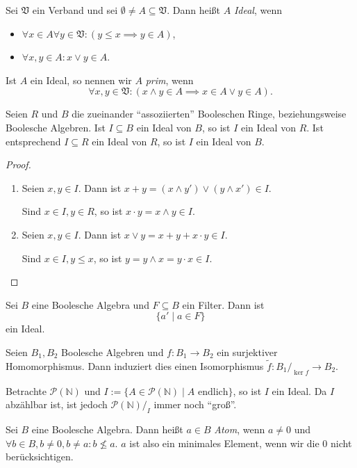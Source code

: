 \begin{definition}
    Sei $\mathfrak{V}$ ein Verband und sei $\emptyset \neq A \subseteq \mathfrak{V}$. Dann heißt $A$ \emph{Ideal}, wenn
    \begin{itemize}
        \item $\forall x \in A \forall y \in \mathfrak{V} : ( y \leq x \implies y \in A )$,
        \item $\forall x, y \in A : x \lor y \in A$.
    \end{itemize}
    Ist $A$ ein Ideal, so nennen wir $A$ \emph{prim}, wenn
    $$ \forall x, y \in \mathfrak{V} : ( x \land y \in A \implies x \in A \lor y \in A ). $$
\end{definition}

\begin{proposition}
    Seien $R$ und $B$ die zueinander ``assoziierten'' Booleschen Ringe, beziehungsweise Boolesche Algebren. Ist $I \subseteq B$ ein Ideal von $B$, so ist $I$ ein Ideal von $R$. Ist entsprechend $I \subseteq R$ ein Ideal von $R$, so ist $I$ ein Ideal von $B$.
\end{proposition}

\begin{proof}{\ }
    \begin{enumerate}
        \item Seien $x, y \in I$. Dann ist $x + y = (x \land y') \lor (y \land x') \in I$.

        Sind $x \in I, y \in R$, so ist $x \cdot y = x \land y \in I$.

        \item Seien $x, y \in I$. Dann ist $x \lor y = x + y + x \cdot y \in I$.
        
        Sind $x \in I, y \leq x$, so ist $y = y \land x = y \cdot x \in I$.
    \end{enumerate}
\end{proof}

\begin{remark}
    Sei $B$ eine Boolesche Algebra und $F \subseteq B$ ein Filter. Dann ist
    $$ \{ a' \mid a \in F \} $$
    ein Ideal.
\end{remark}

\begin{theorem}
    Seien $B_1, B_2$ Boolesche Algebren und $f : B_1 \to B_2$ ein surjektiver Homomorphismus. Dann induziert dies einen Isomorphismus $ \widetilde{f} : B_1 /_{\ker f} \to B_2 $.
\end{theorem}

\begin{example}
    Betrachte $\mathcal{P}(\mathbb{N})$ und $I := \{ A \in \mathcal{P}(\mathbb{N}) \mid A \text{ endlich} \}$, so ist $I$ ein Ideal. Da $I$ abzählbar ist, ist jedoch $\mathcal{P}(\mathbb{N}) /_I$ immer noch ``groß''.
\end{example}

\begin{definition}
    Sei $B$ eine Boolesche Algebra. Dann heißt $a \in B$ \emph{Atom}, wenn $a \neq 0$ und $\forall b \in B, b \neq 0, b \neq a: b \nleq a$. $a$ ist also ein minimales Element, wenn wir die 0 nicht berücksichtigen.
\end{definition}